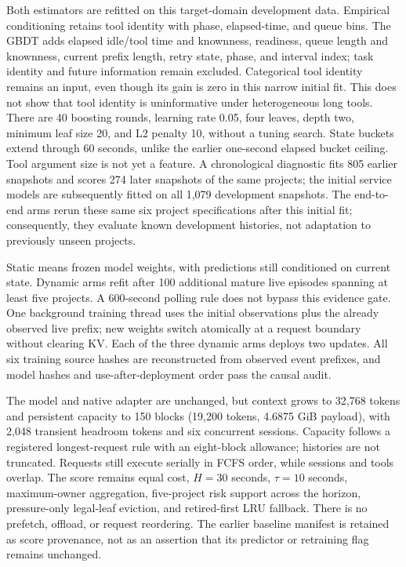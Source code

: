 \documentclass[sigconf, screen, review]{acmart}
\begin{document}
Both estimators are refitted on this target-domain development data.
Empirical conditioning retains tool identity with phase, elapsed-time,
and queue bins. The GBDT adds elapsed idle/tool time and knownness,
readiness, queue length and knownness, current prefix length, retry
state, phase, and interval index; task identity and future information
remain excluded. Categorical tool identity remains an input, even
though its gain is zero in this narrow initial fit. This does not show
that tool identity is uninformative under heterogeneous long tools.
There are 40 boosting rounds, learning rate 0.05, four leaves, depth two,
minimum leaf size 20, and L2 penalty 10, without a tuning search.
State buckets extend through 60 seconds, unlike the earlier
one-second elapsed bucket ceiling. Tool argument size is not yet a
feature. A chronological diagnostic fits 805 earlier snapshots and
scores 274 later snapshots of the same projects; the initial service
models are subsequently fitted on all 1,079 development snapshots.
The end-to-end arms rerun these same six project specifications after
this initial fit; consequently, they evaluate known development
histories, not adaptation to previously unseen projects.

Static means frozen model weights, with predictions still conditioned
on current state. Dynamic arms refit after 100 additional mature live
episodes spanning at least five projects. A 600-second polling rule
does not bypass this evidence gate. One background training thread uses
the initial observations plus the already observed live prefix; new
weights switch atomically at a request boundary without clearing KV.
Each of the three dynamic arms deploys two updates. All six training
source hashes are reconstructed from observed event prefixes, and
model hashes and use-after-deployment order pass the causal audit.

The model and native adapter are unchanged, but context grows to 32,768
tokens and persistent capacity to 150 blocks (19,200 tokens, 4.6875 GiB
payload), with 2,048 transient headroom tokens and six concurrent
sessions. Capacity follows a registered longest-request rule with an
eight-block allowance; histories are not truncated. Requests still
execute serially in FCFS order, while sessions and tools overlap.
The score remains equal cost, \(H=30\) seconds, \(\tau=10\) seconds,
maximum-owner aggregation, five-project risk support across the
horizon, pressure-only legal-leaf eviction, and retired-first LRU
fallback. There is no prefetch, offload, or request reordering.
The earlier baseline manifest is retained as score provenance, not as
an assertion that its predictor or retraining flag remains unchanged.
\end{document}
